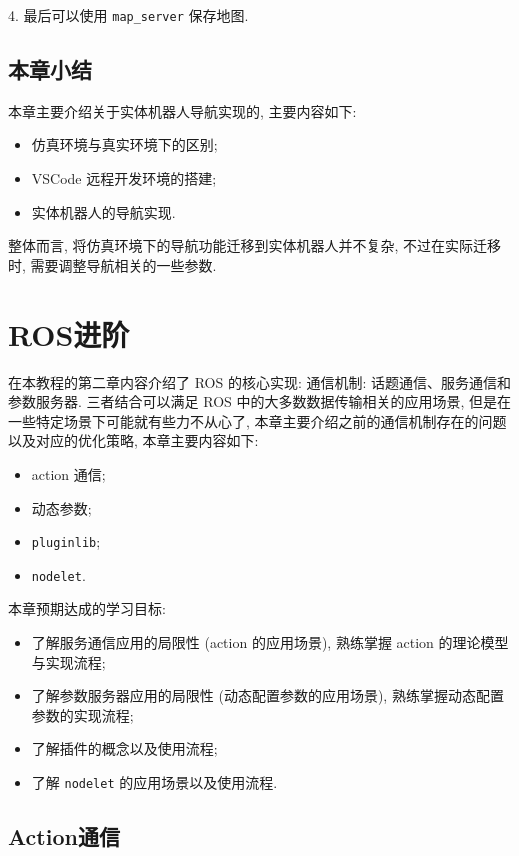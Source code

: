 \documentclass[openany, fontset=windowsold]{ctexbook}
\theoremstyle{kaiti}
\theoremstyle{normal}
\begin{document}
4. 最后可以使用 \verb|map_server| 保存地图.

\section{本章小结}

本章主要介绍关于实体机器人导航实现的, 主要内容如下: 

\begin{itemize}
  \item 仿真环境与真实环境下的区别; 
  \item VSCode 远程开发环境的搭建; 
  \item 实体机器人的导航实现.
\end{itemize}

整体而言, 将仿真环境下的导航功能迁移到实体机器人并不复杂, 不过在实际迁移时, 需要调整导航相关的一些参数.

\chapter{ROS进阶}

在本教程的第二章内容介绍了 ROS 的核心实现: 通信机制: 话题通信、服务通信和参数服务器. 三者结合可以满足 ROS 中的大多数数据传输相关的应用场景, 但是在一些特定场景下可能就有些力不从心了, 本章主要介绍之前的通信机制存在的问题以及对应的优化策略, 本章主要内容如下:

\begin{itemize}
  \item action 通信;
  \item 动态参数;
  \item \verb|pluginlib|;
  \item \verb|nodelet|.
\end{itemize}

本章预期达成的学习目标:

\begin{itemize}
  \item 了解服务通信应用的局限性 (action 的应用场景), 熟练掌握 action 的理论模型与实现流程; 
  \item 了解参数服务器应用的局限性 (动态配置参数的应用场景), 熟练掌握动态配置参数的实现流程; 
  \item 了解插件的概念以及使用流程; 
  \item 了解 \verb|nodelet| 的应用场景以及使用流程.
\end{itemize}

\section{Action通信}
\end{document}
